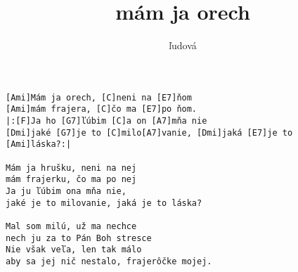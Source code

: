 \author{ľudová}
\title{mám ja orech}
\maketitle
\begin{verbatim}
[Ami]Mám ja orech, [C]neni na [E7]ňom 
[Ami]mám frajera, [C]čo ma [E7]po ňom. 
|:[F]Ja ho [G7]ľúbim [C]a on [A7]mňa nie 
[Dmi]jaké [G7]je to [C]milo[A7]vanie, [Dmi]jaká [E7]je to [Ami]láska?:| 

Mám ja hrušku, neni na nej 
mám frajerku, čo ma po nej 
Ja ju ľúbim ona mňa nie, 
jaké je to milovanie, jaká je to láska? 

Mal som milú, už ma nechce 
nech ju za to Pán Boh stresce 
Nie však veľa, len tak málo 
aby sa jej nič nestalo, frajerôčke mojej.
\end{verbatim}